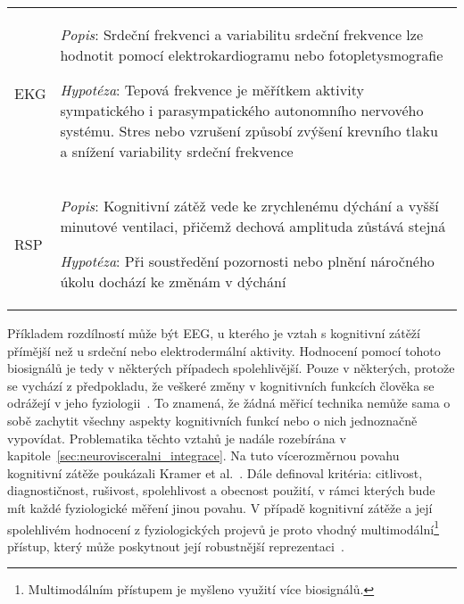 \begin{table}[!htb]
\begin{threeparttable}
\begin{tabular}{p{3cm}p{11cm}}
            \\
            EKG                 & \textit{Popis}: Srdeční frekvenci a variabilitu srdeční frekvence lze hodnotit pomocí elektrokardiogramu nebo fotopletysmografie\newline
            \rule{0pt}{2.5ex}\noindent
            \textit{Hypotéza}: Tepová frekvence je měřítkem aktivity sympatického i parasympatického autonomního nervového systému. Stres nebo vzrušení způsobí zvýšení krevního tlaku a snížení variability srdeční frekvence~\cite{Jercic2020,Solhjoo2019}
            \\
            RSP                 & \textit{Popis}: Kognitivní zátěž vede ke zrychlenému dýchání a vyšší minutové ventilaci, přičemž dechová amplituda zůstává stejná\newline
            \rule{0pt}{2.5ex}\noindent
            \textit{Hypotéza}: Při soustředění pozornosti nebo plnění náročného úkolu dochází ke změnám v dýchání~\cite{Grassmann2016}
            \\
            \bottomrule
        \end{tabular}
    \end{threeparttable}
\end{table}

Příkladem rozdílností může být EEG, u kterého je vztah s kognitivní zátěží
přímější než u srdeční nebo elektrodermální aktivity. Hodnocení pomocí tohoto
biosignálů je tedy v některých případech spolehlivější. Pouze v některých,
protože se vychází z předpokladu, že veškeré změny v kognitivních funkcích
člověka se odrážejí v jeho fyziologii~\cite{Vanneste2021}. To znamená, že žádná
měřicí technika nemůže sama o sobě zachytit všechny aspekty kognitivních funkcí
nebo o nich jednoznačně vypovídat. Problematika těchto vztahů je nadále
rozebírána v kapitole~\ref{sec:neurovisceralni_integrace}. Na tuto vícerozměrnou
povahu kognitivní zátěže poukázali Kramer et al.~\cite{Kramer1991}. Dále
definoval kritéria: citlivost, diagnostičnost, rušivost, spolehlivost a obecnost
použití, v rámci kterých bude mít každé fyziologické měření jinou povahu. V
případě kognitivní zátěže a její spolehlivém hodnocení z fyziologických projevů
je proto vhodný multimodální\footnote{Multimodálním přístupem je myšleno využití
více biosignálů.} přístup, který může poskytnout její robustnější
reprezentaci~\cite{Chen2016}.

